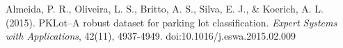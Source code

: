 \documentclass[a4paper, 11pt]{article} %
\begin{document}
\begin{thebibliography}{unsrt}
		Almeida, P. R., Oliveira, L. S., Britto, A. S., Silva, E. J., \& Koerich, A. L. (2015). PKLot--A robust 
		dataset for parking lot classification. \textit{Expert Systems with Applications}, 42(11), 
		4937-4949. doi:10.1016/j.eswa.2015.02.009
\end{thebibliography}
\end{document}
